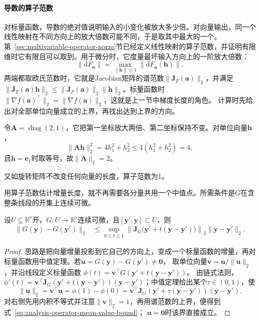 \paragraph{导数的算子范数}
\label{def:analysis-induced-operator-norm}
对标量函数，导数的绝对值说明输入的小变化被放大多少倍。对向量输出，同一个线性映射在不同方向上的放大倍数可能不同，于是取其中最大的一个。第~\ref{sec:multivariable-operator-norm}节已经定义线性映射的算子范数，并证明有限维时它有限且可以取到。用于微分时，它度量最坏输入方向上的一阶放大倍数：
\[
 \lVert\mathrm dF_{\bm a}\rVert=\max_{\lVert\bm h\rVert\leq1}\lVert\mathrm dF_{\bm a}(\bm h)\rVert .
\]
两端都取欧氏范数时，它就是Jacobian矩阵的谱范数$\lVert\bm J_F(\bm a)\rVert_2$，并满足$\lVert\bm J_F(\bm a)\bm h\rVert_2\leq\lVert\bm J_F(\bm a)\rVert_2\lVert\bm h\rVert_2$。标量函数时$\lVert\nabla f(\bm a)^\top\rVert_2=\lVert\nabla f(\bm a)\rVert_2$，这就是上一节中梯度长度的角色。
计算时先给出对全部单位向量成立的上界，再找出达到上界的方向。
\begin{example}[对角矩阵的算子范数]
\label{ex:multivariable-diagonal-operator-norm}
令$\bm A=\operatorname{diag}(2,1)$，它把第一坐标放大两倍、第二坐标保持不变。对单位向量$\bm h$，
\[
 \lVert\bm A\bm h\rVert_2^2=4h_1^2+h_2^2\leq4(h_1^2+h_2^2)=4,
\]
且$\bm h=\bm e_1$时取等号，故$\lVert\bm A\rVert_2=2$。
\end{example}

又如旋转矩阵不改变任何向量的长度，算子范数为$1$。

用算子范数估计增量长度，就不再需要各分量共用一个中值点。所需条件是$G$在含整条线段的开集上连续可微。
\begin{theorem}[向量值函数的中值估计]
\label{thm:multivariable-vector-mean-value}
设$U\subseteq\mathbb R^r$开，$G:U\to\mathbb R^s$连续可微，且$[\bm y',\bm y]\subset U$，则
\begin{equation}
  \begin{aligned}
  \lVert G(\bm{y})-G(\bm{y}')\rVert_2
  &\leq
  \sup_{0\leq t\leq1}
  \left\lVert
    \bm J_G\bigl(\bm{y}'+t(\bm{y}-\bm{y}')\bigr)
  \right\rVert_2
  \lVert\bm{y}-\bm{y}'\rVert_2.
  \end{aligned}
\label{eq:analysis-operator-mean-value-bound}
\end{equation}
\end{theorem}
\begin{proof}
思路是把向量增量投影到它自己的方向上，变成一个标量函数的增量，再对标量函数用中值定理。若$\bm u=G(\bm y)-G(\bm y')\neq\bm0$，
取单位向量$\bm v=\bm u/\lVert\bm u\rVert_2$，并沿线段定义标量函数
$\phi(t)=\bm v^\top G(\bm y'+t(\bm y-\bm y'))$。
由链式法则，$\phi'(t)=\bm v^\top\bm J_G(\bm y'+t(\bm y-\bm y'))(\bm y-\bm y')$；中值定理给出某个$\tau\in(0,1)$，使
\[
 \lVert\bm u\rVert_2
 =\bm v^\top\bm u
 =\phi(1)-\phi(0)
 =\bm v^\top\bm J_G(\bm y'+\tau(\bm y-\bm y'))(\bm y-\bm y').
\]
对右侧先用内积不等式并注意$\lVert\bm v\rVert_2=1$，再用谱范数的上界，便得到式~\eqref{eq:analysis-operator-mean-value-bound}；
$\bm u=\bm0$时该界直接成立。
\end{proof}

